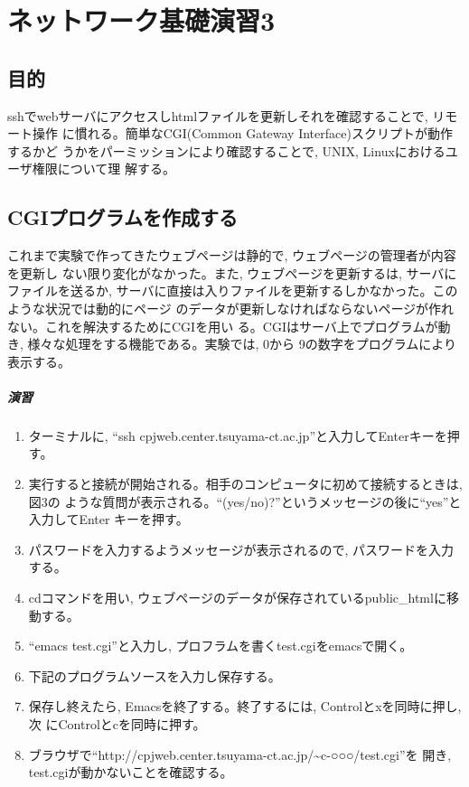 
\chapter{ネットワーク基礎演習3}
\section{目的}
sshでwebサーバにアクセスしhtmlファイルを更新しそれを確認することで, リモート操作
に慣れる。簡単なCGI(Common Gateway Interface)スクリプトが動作するかど
うかをパーミッションにより確認することで, UNIX, Linuxにおけるユーザ権限について理
解する。

\section{CGIプログラムを作成する}
これまで実験で作ってきたウェブページは静的で, ウェブページの管理者が内容を更新し
ない限り変化がなかった。また, ウェブページを更新するは, サーバにファイルを送るか,
サーバに直接は入りファイルを更新するしかなかった。このような状況では動的にページ
のデータが更新しなければならないページが作れない。これを解決するためにCGIを用い
る。CGIはサーバ上でプログラムが動き, 様々な処理をする機能である。実験では, 0から
9の数字をプログラムにより表示する。

\paragraph{演習}
\begin{enumerate}
\item ターミナルに, ``ssh cpjweb.center.tsuyama-ct.ac.jp''と入力してEnterキーを押す。
\item 実行すると接続が開始される。相手のコンピュータに初めて接続するときは, 図3の
      ような質問が表示される。``(yes/no)?''というメッセージの後に``yes''と入力してEnter
      キーを押す。
\item パスワードを入力するようメッセージが表示されるので, パスワードを入力する。
\item cdコマンドを用い, ウェブページのデータが保存されているpublic\_htmlに移動する。
\item ``emacs test.cgi''と入力し, プロフラムを書くtest.cgiをemacsで開く。
\item 下記のプログラムソースを入力し保存する。
\item 保存し終えたら, Emacsを終了する。終了するには, Controlとxを同時に押し, 次
      にControlとcを同時に押す。
\item ブラウザで``http://cpjweb.center.tsuyama-ct.ac.jp/\~{}c-○○○/test.cgi''を
      開き, test.cgiが動かないことを確認する。
\end{enumerate}



